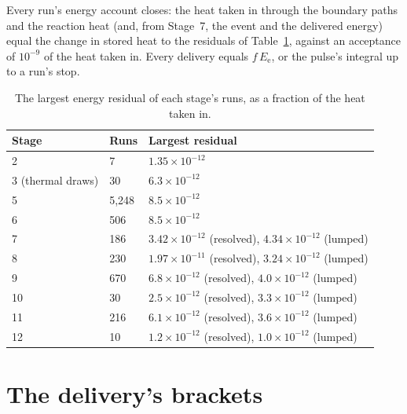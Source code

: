 \documentclass[preprint,12pt]{elsarticle}
\newcommand{\Ee}{E_{\mathrm{e}}}
\begin{document}
Every run's energy account closes: the heat taken in through the boundary paths and the reaction heat (and, from Stage~7, the event and the delivered energy) equal the change in stored heat to the residuals of Table~\ref{tab:s-energy}, against an acceptance of $10^{-9}$ of the heat taken in. Every delivery equals $f\,\Ee$, or the pulse's integral up to a run's stop.

\begin{table}[h]
\centering
\footnotesize
\caption{The largest energy residual of each stage's runs, as a fraction of the heat taken in.}
\label{tab:s-energy}
\begin{tabular}{lll}
\toprule
Stage & Runs & Largest residual \\
\midrule
2 & 7 & $1.35\times10^{-12}$ \\
3 (thermal draws) & 30 & $6.3\times10^{-12}$ \\
5 & 5,248 & $8.5\times10^{-12}$ \\
6 & 506 & $8.5\times10^{-12}$ \\
7 & 186 & $3.42\times10^{-12}$ (resolved), $4.34\times10^{-12}$ (lumped) \\
8 & 230 & $1.97\times10^{-11}$ (resolved), $3.24\times10^{-12}$ (lumped) \\
9 & 670 & $6.8\times10^{-12}$ (resolved), $4.0\times10^{-12}$ (lumped) \\
10 & 30 & $2.5\times10^{-12}$ (resolved), $3.3\times10^{-12}$ (lumped) \\
11 & 216 & $6.1\times10^{-12}$ (resolved), $3.6\times10^{-12}$ (lumped) \\
12 & 10 & $1.2\times10^{-12}$ (resolved), $1.0\times10^{-12}$ (lumped) \\
\bottomrule
\end{tabular}
\end{table}

\section{The delivery's brackets}
\label{sec:s-delivery}
\end{document}
